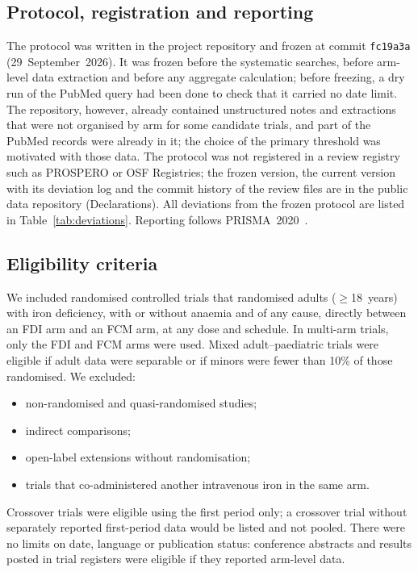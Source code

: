 \documentclass[11pt,a4paper]{article}
\begin{document}
\subsection{Protocol, registration and reporting}
The protocol was written in the project repository and frozen at commit \texttt{fc19a3a} (29~September~2026). It was frozen before the systematic searches, before arm-level data extraction and before any aggregate calculation; before freezing, a dry run of the PubMed query had been done to check that it carried no date limit. The repository, however, already contained unstructured notes and extractions that were not organised by arm for some candidate trials, and part of the PubMed records were already in it; the choice of the primary threshold was motivated with those data. The protocol was not registered in a review registry such as PROSPERO or OSF Registries; the frozen version, the current version with its deviation log and the commit history of the review files are in the public data repository (Declarations). All deviations from the frozen protocol are listed in Table~\ref{tab:deviations}. Reporting follows PRISMA~2020~\cite{Page2021}.

\subsection{Eligibility criteria}
We included randomised controlled trials that randomised adults ($\ge$18~years) with iron deficiency, with or without anaemia and of any cause, directly between an FDI arm and an FCM arm, at any dose and schedule. In multi-arm trials, only the FDI and FCM arms were used. Mixed adult--paediatric trials were eligible if adult data were separable or if minors were fewer than 10\% of those randomised. We excluded:
\begin{itemize}
\item non-randomised and quasi-randomised studies;
\item indirect comparisons;
\item open-label extensions without randomisation;
\item trials that co-administered another intravenous iron in the same arm.
\end{itemize}
Crossover trials were eligible using the first period only; a crossover trial without separately reported first-period data would be listed and not pooled. There were no limits on date, language or publication status: conference abstracts and results posted in trial registers were eligible if they reported arm-level data.
\end{document}
